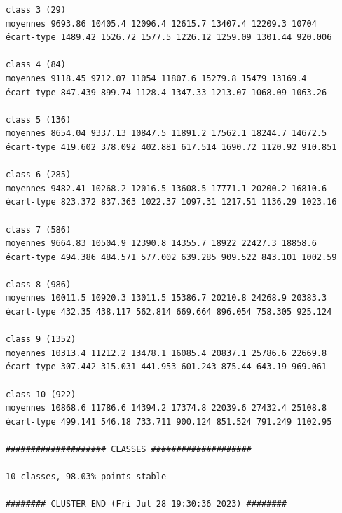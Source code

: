 \documentclass[earth,article,submit,pdftex,moreauthors]{Definitions/mdpi}
\begin{document}
\begin{scriptsize}
\begin{verbatim}
class 3 (29)
moyennes 9693.86 10405.4 12096.4 12615.7 13407.4 12209.3 10704
écart-type 1489.42 1526.72 1577.5 1226.12 1259.09 1301.44 920.006

class 4 (84)
moyennes 9118.45 9712.07 11054 11807.6 15279.8 15479 13169.4
écart-type 847.439 899.74 1128.4 1347.33 1213.07 1068.09 1063.26

class 5 (136)
moyennes 8654.04 9337.13 10847.5 11891.2 17562.1 18244.7 14672.5
écart-type 419.602 378.092 402.881 617.514 1690.72 1120.92 910.851

class 6 (285)
moyennes 9482.41 10268.2 12016.5 13608.5 17771.1 20200.2 16810.6
écart-type 823.372 837.363 1022.37 1097.31 1217.51 1136.29 1023.16

class 7 (586)
moyennes 9664.83 10504.9 12390.8 14355.7 18922 22427.3 18858.6
écart-type 494.386 484.571 577.002 639.285 909.522 843.101 1002.59

class 8 (986)
moyennes 10011.5 10920.3 13011.5 15386.7 20210.8 24268.9 20383.3
écart-type 432.35 438.117 562.814 669.664 896.054 758.305 925.124

class 9 (1352)
moyennes 10313.4 11212.2 13478.1 16085.4 20837.1 25786.6 22669.8
écart-type 307.442 315.031 441.953 601.243 875.44 643.19 969.061

class 10 (922)
moyennes 10868.6 11786.6 14394.2 17374.8 22039.6 27432.4 25108.8
écart-type 499.141 546.18 733.711 900.124 851.524 791.249 1102.95

#################### CLASSES ####################

10 classes, 98.03% points stable

######## CLUSTER END (Fri Jul 28 19:30:36 2023) ########

\end{verbatim}
\end{scriptsize}
\end{document}
